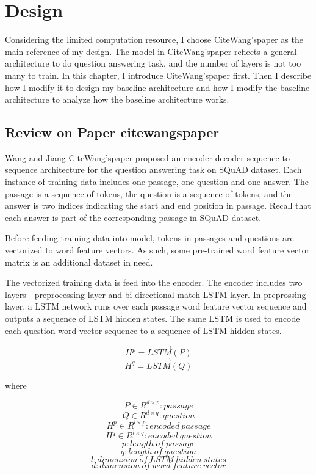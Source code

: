 \documentclass[modernstyle,12pt]{sjsuthesis}
\theoremstyle{definition}
\begin{document}
\chapter{Design}

Considering the limited computation resource, I choose CiteWang'spaper as the main reference of my design. The model in CiteWang'spaper reflects a general architecture to do question answering task, and the number of layers is not too many to train. In this chapter, I introduce CiteWang'spaper first. Then I describe how I modify it to design my baseline architecture and how I modify the baseline architecture to analyze how the baseline architecture works.


\section{Review on Paper citewangspaper}

Wang and Jiang CiteWang'spaper proposed an encoder-decoder sequence-to-sequence architecture for the question answering task on SQuAD dataset. Each instance of training data includes one passage, one question and one answer. The passage is a sequence of tokens, the question is a sequence of tokens, and the answer is two indices indicating the start and end position in passage. Recall that each answer is part of the corresponding passage in SQuAD dataset.

Before feeding training data into model, tokens in passages and questions are vectorized to word feature vectors. As such, some pre-trained word feature vector matrix is an additional dataset in need.

The vectorized training data is feed into the encoder. The encoder includes two layers - preprocessing layer and bi-directional match-LSTM layer. In preprossing layer, a LSTM network runs over each passage word feature vector sequence and outputs a sequence of LSTM hidden states. The same LSTM is used to encode each question word vector sequence to a sequence of LSTM hidden states.

$$H^p = \overrightarrow{LSTM}(P)$$
$$H^q = \overrightarrow{LSTM}(Q)$$

where

 $$P\in R^{d \times p}: passage$$
 $$Q\in R^{d \times q}: question$$
 $$H^p\in R^{l \times p}: encoded\ passage$$
 $$H^q\in R^{l \times q}: encoded\ question$$
 $$p: length \ of\ passage$$
 $$q: length\ of\ question$$
 $$l: dimension\ of\ LSTM\ hidden\ states$$
 $$d: dimension\ of\ word\ feature\ vector$$
\end{document}
